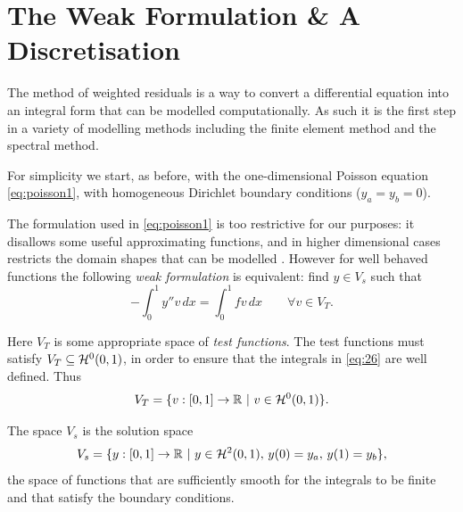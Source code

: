 \section{The Weak Formulation \& A Discretisation}
\label{Derivation-of-weighted-residuals}

The method of weighted residuals is a way to convert a differential equation
into an integral form that can be modelled computationally. As such it is the
first step in a variety of modelling methods including the finite element method
and the spectral method.

For simplicity we start, as before, with the one-dimensional Poisson equation
\eqref{eq:poisson1}, with homogeneous Dirichlet boundary conditions
(\ie $y_{a}=y_{b}=0$).


The formulation used in \eqref{eq:poisson1} is too restrictive for our purposes:
it disallows some useful approximating functions, and in higher dimensional
cases restricts the domain shapes that can be modelled
\cite{HowardElmanDavidSilvester2006}. However for well behaved functions the
following \emph{weak formulation} is equivalent: find $y\in V_{s}$ such that
\begin{equation}
  -\int_{0}^{1}y''v\, dx=\int_{0}^{1}fv\, dx \qquad \forall v\in V_{T}.
  \label{eq:26}
\end{equation}

Here $V_{T}$ is some appropriate space of \emph{test functions}. The test
functions must satisfy $V_{T}\subseteq \mathcal{H}^0(0,1)$, in order to ensure that the integrals in \eqref{eq:26} are well defined. Thus
\begin{equation}
  \label{eq:28}
  V_{T}=\{v:[0,1]\rightarrow\mathbb{R}\, \,|\, \, v \in \mathcal{H}^0(0,1)\}.
\end{equation}

The space $V_{s}$ is the solution space
\begin{equation*}
  V_{s}=\{y:[0,1]\rightarrow\mathbb{R}\, \,|\, \, y \in \mathcal{H}^2(0,1),\,
  y(0) = y_{a},\, y(1) = y_{b}\},
\end{equation*}
 \ie the space of functions that are sufficiently smooth for the integrals to be finite and that satisfy the boundary conditions.

